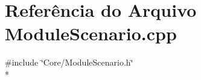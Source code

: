 \section{Referência do Arquivo Module\+Scenario.\+cpp}
\label{_module_scenario_8cpp}
{\ttfamily \#include \char`\"{}Core/\+Module\+Scenario.\+h\char`\"{}}\\*
